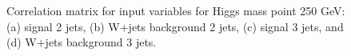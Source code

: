 \begin{figure}[bthp!]
{}


\caption{\label{fig:FigCorr250Mu} 
Correlation matrix for input variables for Higgs mass point 250 GeV:
(a) signal 2 jets, (b) W+jets background 2 jets, 
(c) signal 3 jets, and (d) W+jets background 3 jets.
}
\end{figure}
\newpage
